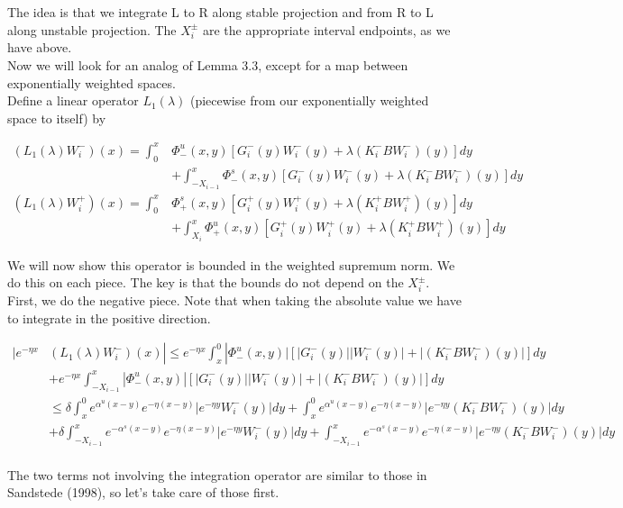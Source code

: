 \documentclass[12pt]{article}
\begin{document}
The idea is that we integrate L to R along stable projection and from R to L along unstable projection. The $X_i^\pm$ are the appropriate interval endpoints, as we have above.\\

Now we will look for an analog of Lemma 3.3, except for a map between exponentially weighted spaces. \\

Define a linear operator $L_1(\lambda)$ (piecewise from our exponentially weighted space to itself) by

\begin{align*}
(L_1(\lambda)W_i^-)(x) = \int_0^x &\Phi^u_-(x, y)[G_i^-(y) W_i^-(y) + \lambda (K_i^- B W_i^-)(y) ] dy \\
&+ \int_{-X_{i-1}}^x \Phi^s_-(x, y)[G_i^-(y) W_i^-(y) + \lambda (K_i^-B W_i^-)(y) ] dy \\
(L_1(\lambda)W_i^+)(x) = \int_0^x &\Phi^s_+(x, y)[G_i^+(y) W_i^+(y) + \lambda (K_i^+ B W_i^+)(y)] dy \\
&+ \int_{X_{i}}^x \Phi^u_+(x, y)[G_i^+(y) W_i^+(y) + \lambda (K_i^+ B W_i^+)(y) ] dy
\end{align*}

We will now show this operator is bounded in the weighted supremum norm. We do this on each piece. The key is that the bounds do not depend on the $X_i^\pm$. First, we do the negative piece. Note that when taking the absolute value we have to integrate in the positive direction.

\begin{align*}
|e^{-\eta x} & (L_1(\lambda)W_i^-)(x) | \leq  e^{-\eta x} \int_x^0 |\Phi^u_-(x, y)|[|G_i^-(y)||W_i^-(y)| + |(K_i^- B W_i^-)(y)| ] dy \\
&+ e^{-\eta x} \int_{-X_{i-1}}^x |\Phi^u_-(x, y)|[|G_i^-(y)||W_i^-(y)| + |(K_i^- B W_i^-)(y)| ] dy \\
&\leq \delta \int_x^0 e^{\alpha^u (x-y)}e^{-\eta(x-y)}|e^{-\eta y} W_i^-(y)| dy 
+ \int_x^0 e^{\alpha^u (x-y)}e^{-\eta(x-y)}|e^{-\eta y} (K_i^- B W_i^-)(y)| dy \\
&+ \delta \int_{-X_{i-1}}^x e^{-\alpha^s (x-y)}e^{-\eta(x-y)}|e^{-\eta y} W_i^-(y)| dy 
+ \int_{-X_{i-1}}^x e^{-\alpha^s (x-y)}e^{-\eta(x-y)}|e^{-\eta y} (K_i^- B W_i^-)(y)| dy  \\ 
\end{align*}

The two terms not involving the integration operator are similar to those in Sandstede (1998), so let's take care of those first.
\end{document}
